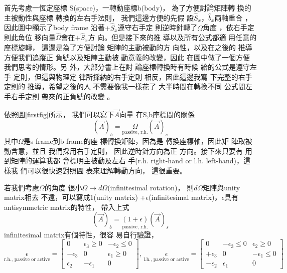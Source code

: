 \documentclass[12pt,twoside]{article}
\begin{document}
首先考慮一恆定座標%
S(space)，一轉動座標b(body)，%
為了方便討論矩陣轉%
換的主被動性與座標%
轉換的左右手法則，%
我們這邊方便的先假%
設$\hat{S}_{x}， \hat{b}_{x}$兩軸重合%
，因此圖中顯示了body frame%
沿著$+\hat{S}_{x}$遵守右手定%
則逆時針轉了$\Omega $角度%
，依右手定則此角位%
移向量$\hat{\Omega}$會在$+\hat{S}_{x}$方%
向。但是接下來的推%
導以及所有公式都適%
用任意的座標旋轉，%
這邊是為了方便討論%
矩陣的主動被動的方%
向性，以及在之後的%
推導方便我們追蹤正%
負號以及矩陣主動被%
動意義的改變，因此%
在圖中做了一個方便%
我們思考的情形。另%
外，大部分書上在討%
論座標轉換時有時候%
給的公式是遵守左手%
定則，但這與物理定%
律所採納的右手定則%
相反，因此這邊我寫%
下完整的右手定則的%
推導，希望之後的人%
不需要像我一樣花了%
大半時間在轉換不同%
公式間左手右手定則%
帶來的正負號的改變%
。

\bigskip 依照圖\ref{firstfig}所示，%
我們可以寫下$\vec{A}$向量%
在S,b座標間的關係%
\begin{equation*}
\left( \vec{A}\right) _{b}=\underset{\text{passive, r.h.}}{\Omega }\left( 
\vec{A}\right) _{s}
\end{equation*}%
其中$\Omega $是s frame到b frame的座%
標轉換矩陣，因為是%
轉換座標軸，因此矩%
陣取被動含意，並且%
我們採用右手定則，%
因此逆時針方向為正%
方向。接下來只要有%
用到矩陣的運算我都%
會標明主被動及左右%
手(r.h. right-hand or l.h. left-hand)，這樣我%
們可以很快速對照圖%
表來理解轉動方向，%
這很重要。

若我們考慮$\Omega $的角度%
很小$\Omega \rightarrow d\Omega $(infinitesimal rotation)，%
則$d\Omega $矩陣與unity matrix相去%
不遠，可以寫成$1$(unity matrix) +$%
\epsilon $(infinitesimal matrix)，$\epsilon $具有%
antisymmetric matrix的特性\cite[p. 169]{goldstein}，%
帶入上式%
\begin{equation*}
\left( \vec{A}\right) _{b}=\underset{\text{passive, r.h.}}{\left( 1+\epsilon
\right) }\left( \vec{A}\right) _{s}
\end{equation*}%
infinitesimal matrix有個特性，很容%
易自行驗證，%
\begin{equation*}
\underset{\text{r.h., passive or active}}{\epsilon }=\left[ 
\begin{array}{ccc}
0 & \epsilon _{3}\geq 0 & -\epsilon _{2}\leq 0 \\ 
-\epsilon _{3} & 0 & \epsilon _{1}\geq 0 \\ 
\epsilon _{2} & -\epsilon _{1} & 0%
\end{array}%
\right] \text{, }\underset{\text{l.h., passive or active}}{\epsilon }=\left[ 
\begin{array}{ccc}
0 & -\epsilon _{3}\leq 0 & \epsilon _{2}\geq 0 \\ 
+\epsilon _{3} & 0 & -\epsilon _{1}\leq 0 \\ 
-\epsilon _{2} & \epsilon _{1} & 0%
\end{array}%
\right]
\end{equation*}
\end{document}
